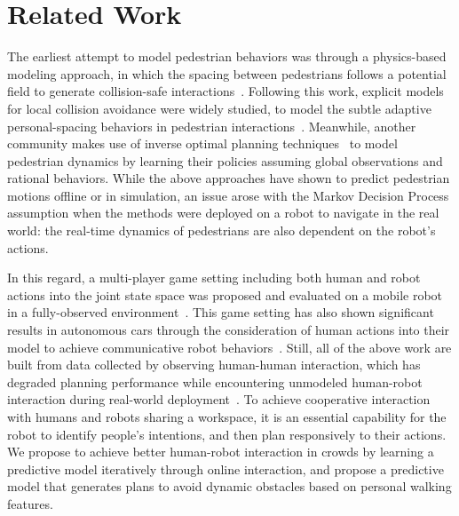 \documentclass[conference]{IEEEtran}
\begin{document}
\section{Related Work}
\label{sec:related}
\vspace{-0.4em}
The earliest attempt to model pedestrian behaviors was through a physics-based 
modeling approach, in which the spacing between pedestrians follows a 
potential field to generate collision-safe 
interactions~\cite{helbing1995social}. Following this work, explicit models 
for local collision avoidance were widely studied, to model the subtle 
adaptive personal-spacing behaviors in pedestrian 
interactions~\cite{papadakis2014adaptive}. Meanwhile, another community 
makes use of inverse optimal planning 
techniques~\cite{ziebart2009planning,henry2010learning,vasquez2014inverse} to 
model pedestrian dynamics by learning their policies assuming global observations and 
rational behaviors.
While the above approaches have shown to predict pedestrian motions 
offline or in simulation, an issue arose with the Markov Decision 
Process assumption when the methods were deployed on a robot to navigate in the real world:
the real-time dynamics of pedestrians are also dependent on the robot's 
actions. 

In this regard, a multi-player game setting including both human and robot actions into the joint state space was proposed and evaluated on a mobile robot in a fully-observed environment~\cite{trautman2010unfreezing}. This game setting has also shown significant results in autonomous cars through the consideration of human actions into their model to achieve communicative robot behaviors~\cite{sadigh2016planning}.
Still, all of the above work are built from data collected by observing human-human 
interaction, which has degraded planning performance while encountering unmodeled 
human-robot interaction during real-world 
deployment~\cite{trautman2015robot, pfeiffer2016predicting}. To achieve 
cooperative interaction with humans and robots sharing a workspace, it is 
an essential capability for the robot to identify people's 
intentions, and then plan responsively to their actions. We propose to achieve 
better human-robot interaction in crowds by learning a predictive model 
iteratively through online interaction, and propose a predictive model 
that generates plans to avoid dynamic obstacles based on personal walking features. 
\vspace{-0.1em}
\end{document}
